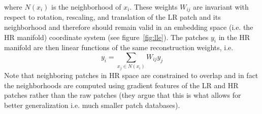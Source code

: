 where $N(x_i)$ is the neighborhood of $x_i$.
%
These weights $W_{ij}$ are invariant with respect to rotation, rescaling, and translation of the LR patch and its neighborhood\cite{saul2000introduction} and therefore should remain valid in an embedding space (i.e. the HR manifold) coordinate system (see figure~\ref{fig:lle}).
%
The patches $y_i$ in the HR manifold are then linear functions of the same reconstruction weights, i.e.
\begin{equation}
    y_i = \sum_{x_j \in N(x_i)} W_{ij} y_j
\end{equation}
%
Note that neighboring patches in HR space are constrained to overlap and in fact the neighborhoods are computed using gradient features of the LR and HR patches rather than the raw patches (they argue that this is what allows for better generalization i.e. much smaller patch databases).

